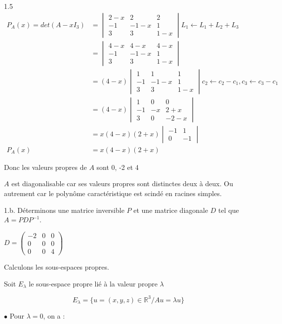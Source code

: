 \documentclass[12pt]{article}
\begin{document}
\begin{spacing}{1.5}
\begin{align*}
P_A(x)=det(A-xI_3)&=\begin{vmatrix}
2-x & 2& 2 \\ 
-1 & -1-x & 1 \\ 
3 & 3 & 1-x
\end{vmatrix}L_1\leftarrow L_1+L_2+L_3\\
&=\begin{vmatrix}
4-x & 4-x & 4-x \\ 
-1 & -1-x & 1 \\ 
3 & 3 & 1-x
\end{vmatrix}\\
&=(4-x)\begin{vmatrix}
1 & 1 & 1 \\ 
-1 & -1-x & 1 \\ 
3 & 3 & 1-x
\end{vmatrix}c_2\leftarrow c_2-c_1, c_3\leftarrow c_3-c_1\\
&=(4-x)\begin{vmatrix}
1 & 0 & 0 \\ 
-1 & -x & 2+x \\ 
3 & 0 & -2-x
\end{vmatrix}\\
&=x(4-x)(2+x)\begin{vmatrix}
-1 & 1 \\ 
 0 & -1
\end{vmatrix}\\
P_A(x) &= x(4-x)(2+x)
\end{align*}

Donc les valeurs propres de $A$ sont 0, -2 et 4

$A$ est diagonalisable car ses valeurs propres sont distinctes deux à deux. Ou autrement car le polynôme caractéristique est scindé en racines simples.

1.b. Déterminons une matrice inversible $P$ et une matrice diagonale $D$ tel que $A=PDP^{-1}$.

$D=\begin{pmatrix}
-2 & 0& 0 \\ 
0 & 0 & 0 \\ 
0 & 0 & 4
\end{pmatrix}$

Calculons les sous-espaces propres.

Soit $E_\lambda$ le sous-espace propre lié à la valeur propre $\lambda$

\[
E_\lambda=\{u=(x,y,z)\in \mathbb{R}^3/Au=\lambda u\}
\]

\medskip
$\bullet$ Pour $\lambda=0$, on a :


\end{spacing}
\end{document}
